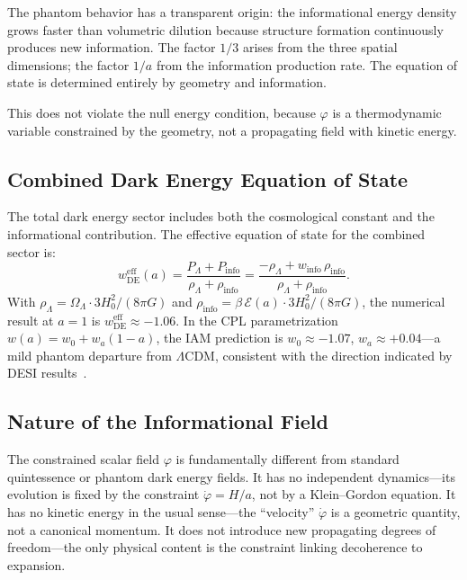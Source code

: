 \documentclass[twocolumn,a4paper,aps,prd,twocolumn,showpacs,notitlepage,superscriptaddress,nofootinbib]{article}
\begin{document}
The phantom behavior has a transparent origin: the informational energy
density grows faster than volumetric dilution because structure formation
continuously produces new information.  The factor $1/3$ arises from the
three spatial dimensions; the factor $1/a$ from the information production
rate.  The equation of state is determined entirely by geometry and
information.

This does not violate the null energy condition, because $\varphi$ is a
thermodynamic variable constrained by the geometry, not a propagating field
with kinetic energy.

\subsection{Combined Dark Energy Equation of State}

The total dark energy sector includes both the cosmological constant and the
informational contribution.  The effective equation of state for the combined
sector is:
\begin{equation}
w_\mathrm{DE}^\mathrm{eff}(a) = \frac{P_\Lambda + P_\mathrm{info}}
  {\rho_\Lambda + \rho_\mathrm{info}}
= \frac{-\rho_\Lambda + w_\mathrm{info}\,\rho_\mathrm{info}}
  {\rho_\Lambda + \rho_\mathrm{info}}.
\label{eq:w_eff}
\end{equation}
With $\rho_\Lambda = \Omega_\Lambda \cdot 3H_0^2/(8\pi G)$ and
$\rho_\mathrm{info} = \beta\,\mathcal{E}(a)\cdot 3H_0^2/(8\pi G)$, the
numerical result at $a = 1$ is $w_\mathrm{DE}^\mathrm{eff} \approx -1.06$.
In the CPL parametrization $w(a) = w_0 + w_a(1-a)$, the IAM prediction is
$w_0 \approx -1.07$, $w_a \approx +0.04$---a mild phantom departure from
$\Lambda$CDM, consistent with the direction indicated by DESI
results~\citep{DESI2025}.

\subsection{Nature of the Informational Field}

The constrained scalar field $\varphi$ is fundamentally different from
standard quintessence or phantom dark energy fields.  It has no independent
dynamics---its evolution is fixed by the constraint $\dot{\varphi} = H/a$,
not by a Klein--Gordon equation.  It has no kinetic energy in the usual
sense---the ``velocity'' $\dot{\varphi}$ is a geometric quantity, not a
canonical momentum.  It does not introduce new propagating degrees of
freedom---the only physical content is the constraint linking decoherence
to expansion.
\end{document}

